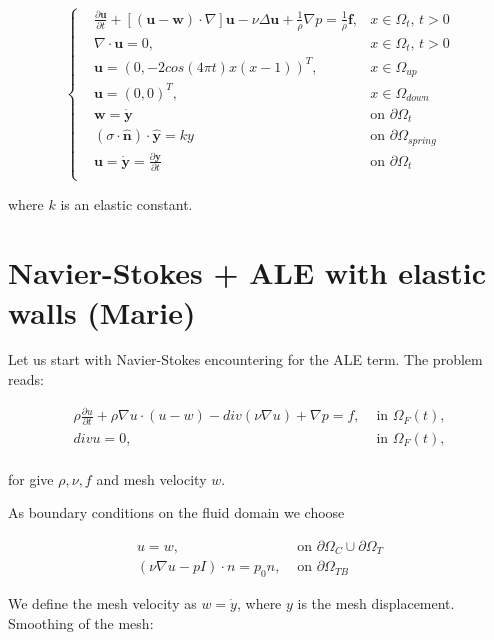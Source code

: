 \documentclass[11pt,a4paper,titlepage]{report}
\begin{document}
\[
\left\{  
\begin{aligned}
&\frac{\partial \mathbf{u}}{\partial t} + [(\mathbf{u - w}) \cdot \nabla] \mathbf{u} - \nu \Delta \mathbf{u} + \frac{1}{\rho} \nabla p = \frac{1}{\rho} \mathbf{f},  & x \in \Omega_t, \, t>0 \\
& \nabla \cdot \mathbf{u} = 0, & x \in \Omega_t, \, t>0 \\
& \mathbf{u} = (0, -2cos(4 \pi t) x(x-1) )^T, & x \in \Omega_{up} \\
& \mathbf{u} = (0,0)^T, & x \in \Omega_{down} \\
& \mathbf{w} = \dot{\mathbf{y}} & \text{on } \partial \Omega_t \\
& (\sigma \cdot \hat{\mathbf{n}}) \cdot \hat{\mathbf{y}} = ky & \text{on } \partial \Omega_{spring} \\
& \mathbf{u} = \dot{\mathbf{y}} = \frac{\partial \mathbf{y}}{\partial t}  & \text{on } \partial \Omega_{t} \\
\end{aligned}
\right.
\]

where $k$ is an elastic constant. 

\section{Navier-Stokes + ALE with elastic walls (Marie)}
Let us start with Navier-Stokes encountering for the ALE term. The problem reads:

\[
\begin{aligned}
\rho \frac{\partial u}{\partial t} + \rho \nabla u \cdot (u-w) - div(\nu \nabla u) + \nabla p = f  , & \text{ in } \Omega_F (t), \\
div u = 0, & \text{ in } \Omega_F (t), \\
\end{aligned}
\]

for give $\rho, \nu, f$ and mesh velocity $w$.

As boundary conditions on the fluid domain we choose

\[
\begin{aligned}
u = w, & \text{ on } \partial \Omega_C \cup \partial \Omega_T \\
(\nu \nabla u - pI) \cdot n = p_0 n, & \text{ on } \partial \Omega_{TB}
\end{aligned}
\]

We define the mesh velocity as $w = \dot{y}$, where $y$ is the mesh displacement. \\
Smoothing of the mesh:
\end{document}
